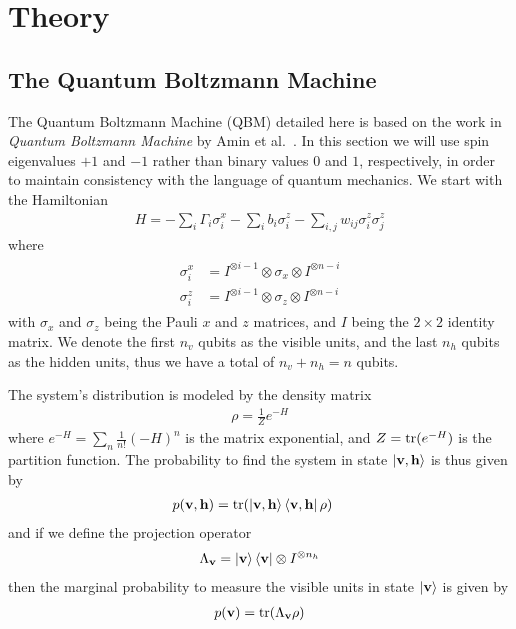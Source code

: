 \section{Theory}
\subsection{The Quantum Boltzmann Machine}
The Quantum Boltzmann Machine (QBM) detailed here is based on the work in \textit{Quantum Boltzmann Machine} by Amin et al.~\cite{amin_2018}.
In this section we will use spin eigenvalues \( +1 \) and \( -1 \) rather than binary values \( 0 \) and \( 1 \), respectively, in order to maintain consistency with the language of quantum mechanics.
We start with the Hamiltonian
\begin{align}
    H = -\sum_i \Gamma_i \sigma_i^x -\sum_i b_i \sigma_i^z - \sum_{i,j} w_{ij} \sigma_i^z \sigma_j^z
\end{align}
where
\begin{align}
\begin{split}
    \sigma_i^x
        &= I^{\otimes i-1} \otimes \sigma_x \otimes I^{\otimes n-i} \\
    \sigma_i^z
        &= I^{\otimes i-1} \otimes \sigma_z \otimes I^{\otimes n-i}
\end{split}
\end{align}
with \( \sigma_x \) and \( \sigma_z \) being the Pauli \( x \) and \( z \) matrices, and \( I \) being the \( 2 \times 2 \) identity matrix.
We denote the first \( n_v \) qubits as the visible units, and the last \( n_h \) qubits as the hidden units, thus we have a total of \( n_v + n_h = n \) qubits.

The system's distribution is modeled by the density matrix
\begin{align}
    \rho = \frac{1}{Z} e^{-H}
\end{align}
where \( e^{-H} = \sum_n \frac{1}{n!} (-H)^n \) is the matrix exponential, and \( Z = \text{tr}(e^{-H}) \) is the partition function.
The probability to find the system in state \( \ket{\mathbf{v},\mathbf{h}} \) is thus given by
\begin{align}
    p(\mathbf{v},\mathbf{h})
        &= \text{tr}(\ket{\mathbf{v},\mathbf{h}}\bra{\mathbf{v},\mathbf{h}} \rho)
\end{align}
and if we define the projection operator
\begin{align}
    \Lambda_{\mathbf{v}} = \ket{\mathbf{v}}\bra{\mathbf{v}} \otimes I^{\otimes n_h}
\end{align}
then the marginal probability to measure the visible units in state \( \ket{\mathbf{v}} \) is given by
\begin{align}
    p(\mathbf{v}) = \text{tr}(\Lambda_{\mathbf{v}}\rho)
\end{align}

